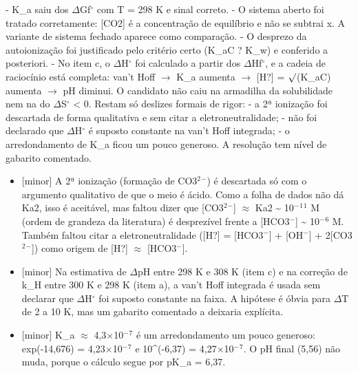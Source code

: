 \documentclass{article}%
\begin{document}
{-} K\_a saiu dos $\Delta$Gf$^\circ$ com T = 298 K e sinal correto.\newline%
{-} O sistema aberto foi tratado corretamente: {[}CO2{]} é a concentração de equilíbrio e não se subtrai x. A variante de sistema fechado aparece como comparação.\newline%
{-} O desprezo da autoionização foi justificado pelo critério certo (K\_aC ? K\_w) e conferido a posteriori.\newline%
{-} No item c, o $\Delta$H$^\circ$ foi calculado a partir dos $\Delta$Hf$^\circ$, e a cadeia de raciocínio está completa: van't Hoff $\to$ K\_a aumenta $\to$ {[}H?{]} = $\surd$(K\_aC) aumenta $\to$ pH diminui. O candidato não caiu na armadilha da solubilidade nem na do $\Delta$S$^\circ$ < 0.\newline%
\newline%
Restam só deslizes formais de rigor:\newline%
{-} a 2ª ionização foi descartada de forma qualitativa e sem citar a eletroneutralidade;\newline%
{-} não foi declarado que $\Delta$H$^\circ$ é suposto constante na van't Hoff integrada;\newline%
{-} o arredondamento de K\_a ficou um pouco generoso.\newline%
\newline%
A resolução tem nível de gabarito comentado.%
\begin{itemize}%
\item%
{[}minor{]} A 2ª ionização (formação de CO3$^2$$^{-}$) é descartada só com o argumento qualitativo de que o meio é ácido. Como a folha de dados não dá Ka2, isso é aceitável, mas faltou dizer que {[}CO3$^2$$^{-}${]} $\approx$ Ka2 \textasciitilde{} 10$^{-}$$^{1}$$^{1}$ M (ordem de grandeza da literatura) é desprezível frente a {[}HCO3$^{-}${]} \textasciitilde{} 10$^{-}$$^{6}$ M. Também faltou citar a eletroneutralidade ({[}H?{]} = {[}HCO3$^{-}${]} + {[}OH$^{-}${]} + 2{[}CO3$^2$$^{-}${]}) como origem de {[}H?{]} $\approx$ {[}HCO3$^{-}${]}.%
\item%
{[}minor{]} Na estimativa de $\Delta$pH entre 298 K e 308 K (item c) e na correção de k\_H entre 300 K e 298 K (item a), a van't Hoff integrada é usada sem declarar que $\Delta$H$^\circ$ foi suposto constante na faixa. A hipótese é óbvia para $\Delta$T de 2 a 10 K, mas um gabarito comentado a deixaria explícita.%
\item%
{[}minor{]} K\_a $\approx$ 4,3$\times$10$^{-}$$^{7}$ é um arredondamento um pouco generoso: exp(-14,676) = 4,23$\times$10$^{-}$$^{7}$ e 10\^{}(-6,37) = 4,27$\times$10$^{-}$$^{7}$. O pH final (5,56) não muda, porque o cálculo segue por pK\_a = 6,37.%
\end{itemize}%
\end{document}
